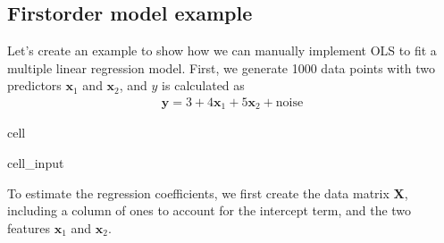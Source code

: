 \documentclass[letterpaper,10pt,english]{jupyterBook}
\begin{document}
\subsection{First\sphinxhyphen{}order model example}
\label{\detokenize{notebooks/review_linear_models:first-order-model-example}}
\sphinxAtStartPar
Let’s create an example to show how we can manually implement OLS to fit a multiple linear regression model. First, we generate 1000 data points with two predictors \(\mathbf{x}_1\) and \(\mathbf{x}_2\), and \(y\) is calculated as
\begin{equation*}
\begin{split}\mathbf{y} = 3 + 4 \mathbf{x}_1 + 5 \mathbf{x}_2 + \text{noise}\end{split}
\end{equation*}
\begin{sphinxuseclass}{cell}\begin{sphinxVerbatimInput}

\begin{sphinxuseclass}{cell_input}
\begin{sphinxVerbatim}[commandchars=\\\{\}]
     
     
             
\end{sphinxVerbatim}

\end{sphinxuseclass}\end{sphinxVerbatimInput}

\end{sphinxuseclass}
\sphinxAtStartPar
To estimate the regression coefficients, we first create the data matrix \(\mathbf{X}\), including a column of ones to account for the intercept term, and the two features \(\mathbf{x}_1\) and \(\mathbf{x}_2\).
\end{document}
